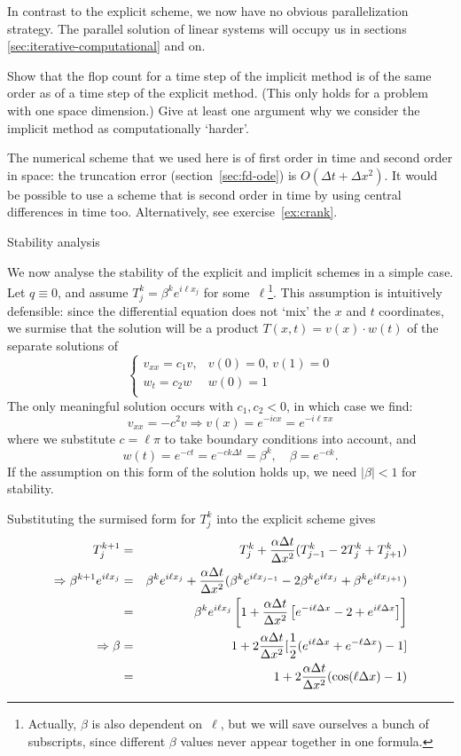 In contrast to the explicit scheme, we now have no 
obvious parallelization strategy. The parallel solution of linear
systems will occupy us in sections \ref{sec:iterative-computational}
and on.

\begin{exercise}
  Show that the flop count for a time step of the implicit method is
  of the same order as of a time step of the explicit method. (This
  only holds for a problem with one space dimension.) Give at least
  one argument why we consider the implicit method as computationally
  `harder'.
\end{exercise}

The numerical scheme that we used here is of first order in time and
second order in space: the truncation error (section~\ref{sec:fd-ode})
is $O(\Delta t+\Delta x^2)$. It would be possible to use a scheme that
is second order in time by using central differences in time
too. Alternatively, see exercise~\ref{ex:crank}.

 {Stability analysis}

We now analyse the stability of the explicit and implicit
schemes in a simple case. Let $q\equiv0$, and assume
$T_j^k=\beta^ke^{i\ell x_j}$ for some~$\ell$\footnote{Actually,
  $\beta$ is also dependent on~$\ell$, but we will save ourselves a
  bunch of subscripts, since different $\beta$ values never appear
  together in one formula.}. This assumption is intuitively
defensible: since the differential equation does not `mix' the $x$ and
$t$ coordinates, we surmise that the solution will be a product
$T(x,t)=v(x)\cdot w(t)$ of the
separate solutions of
\[
\begin{cases}
  v_{xx}=c_1 v,&v(0)=0,\,v(1)=0\\
  w_t=c_2 w & w(0)=1\\
\end{cases}
\]
The only meaningful solution occurs with $c_1,c_2<0$, in which case we
find:
\[ v_{xx}=-c^2v \Rightarrow v(x)=e^{-icx}=e^{-i\ell\pi x} \]
where we substitute $c=\ell\pi$ to take boundary conditions into
account,
and 
\[ w(t) = e^{-ct} = e^{-ck\Delta t} = \beta^k,\quad \beta=e^{-ck}. \]
If the assumption on this form of the solution holds up, we need
$|\beta|<1$ for stability.

Substituting the surmised form for $T_j^k$ into the  explicit scheme gives
  \begin{eqnarray*}
    T_j^{k+1}&=&T_j^k+\frac{\alpha\Delta t}{\Delta x^2}(T_{j-1}^k-2T_j^k+T_{j+1}^k)\\
    \Rightarrow \beta^{k+1}e^{i\ell x_j}&=&\beta^ke^{i\ell x_j}
    +\frac{\alpha\Delta t}{\Delta x^2} (\beta^ke^{i\ell x_{j-1}}-2\beta^ke^{i\ell x_j}+\beta^ke^{i\ell x_{j+1}})\\
    &=&\beta^ke^{i\ell x_j}\left[1+\frac{\alpha\Delta t}{\Delta x^2}\left[e^{-i\ell\Delta x}-2+e^{i\ell\Delta x}\right]\right]\\
    \Rightarrow \beta&=&
    1+2\frac{\alpha\Delta t}{\Delta x^2}[\frac12(e^{i\ell\Delta x}+e^{-\ell\Delta x})-1]\\
    &=&1+2\frac{\alpha\Delta t}{\Delta x^2}(\cos(\ell\Delta x)-1)
  \end{eqnarray*}

